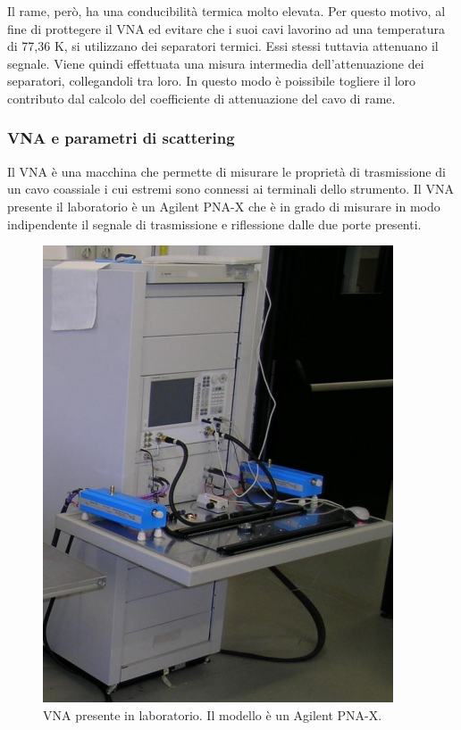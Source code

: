 Il rame, però, ha una conducibilità termica molto elevata. Per questo motivo, al fine di prottegere il VNA ed evitare che i suoi cavi lavorino ad una temperatura di 77,36 K, si utilizzano dei separatori termici. Essi stessi tuttavia attenuano il segnale. Viene quindi effettuata una misura intermedia dell'attenuazione dei separatori, collegandoli tra loro. In questo modo è poissibile togliere il loro contributo dal calcolo del coefficiente di attenuazione del cavo di rame.

\subsubsection{VNA e parametri di scattering}
Il VNA è una macchina che permette di misurare le proprietà di trasmissione di un cavo coassiale i cui estremi sono connessi ai terminali dello strumento. Il VNA presente il laboratorio è un Agilent PNA-X che è in grado di misurare in modo indipendente il segnale di trasmissione e riflessione dalle due porte presenti.
\begin{figure}[h]
\includegraphics[scale=0.60]{VNA.png}
\centering
\caption{VNA presente in laboratorio. Il modello è un Agilent PNA-X.}
\label{fig:VNA}
\end{figure}


